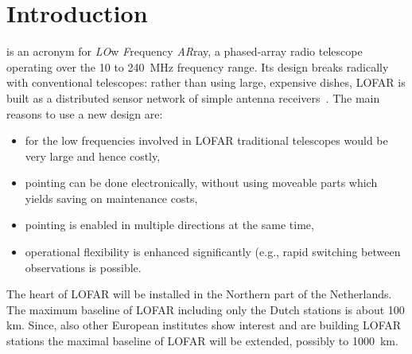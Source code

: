 \documentclass[journal]{IEEEtran}
\begin{document}
\section{Introduction}
% 
% 
% 
% 

 is an acronym for {\em LO\/}w {\em F\/}requency
{\em AR\/}ray, a phased-array radio telescope operating over the 10 to
240~MHz frequency range.
Its design breaks radically with conventional telescopes:
rather than using large, expensive dishes, LOFAR is built as a distributed
sensor network of simple antenna receivers~\cite{Butcher:04}.
The main reasons to use a new design are:

\begin{itemize}
\item for the low frequencies involved in LOFAR traditional telescopes would be very large and hence costly,
\item pointing can be done electronically, without using moveable parts which yields saving on maintenance costs,
\item pointing is enabled in multiple directions at the same time,
\item operational flexibility is enhanced significantly (e.g., rapid switching between observations is possible.
\end{itemize}

The heart of LOFAR will be installed in the Northern part of the Netherlands. The maximum baseline of LOFAR including only the Dutch stations is about 100 km. Since, also other European institutes show interest and are building LOFAR stations the maximal baseline of LOFAR will be extended, possibly to 1000~km.  
\end{document}
